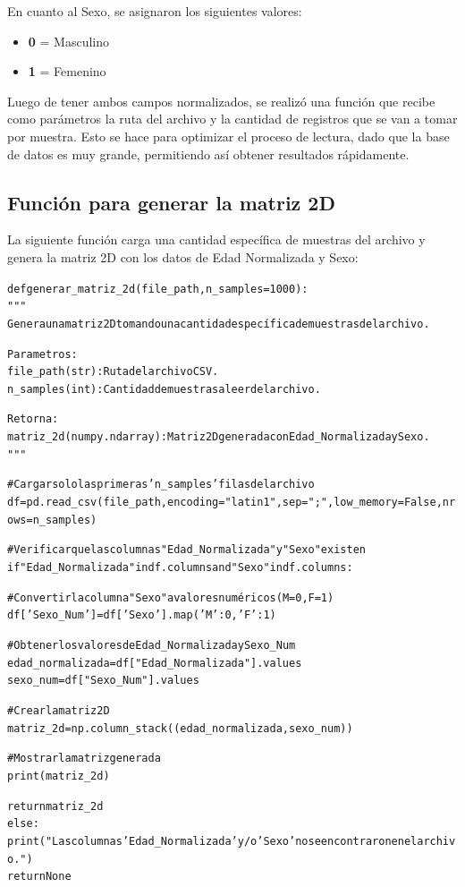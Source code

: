\documentclass[a4paper, 10pt]{article}
\begin{document}
En cuanto al Sexo, se asignaron los siguientes valores:

\begin{itemize}
    \item \textbf{0} = Masculino
    \item \textbf{1} = Femenino
\end{itemize}

Luego de tener ambos campos normalizados, se realizó una función que recibe como parámetros la ruta del archivo y la cantidad de registros que se van a tomar por muestra. Esto se hace para optimizar el proceso de lectura, dado que la base de datos es muy grande, permitiendo así obtener resultados rápidamente. 

\subsection{Función para generar la matriz 2D}\label{s:2.2}

La siguiente función carga una cantidad específica de muestras del archivo y genera la matriz 2D con los datos de Edad Normalizada y Sexo:

\begin{alltt}
def generar_matriz_2d(file_path, n_samples=1000):
    """
    Genera una matriz 2D tomando una cantidad específica de muestras del archivo.

    Parametros:
        file_path (str): Ruta del archivo CSV.
        n_samples (int): Cantidad de muestras a leer del archivo.

    Retorna:
        matriz_2d (numpy.ndarray): Matriz 2D generada con Edad_Normalizada y Sexo.
    """

    # Cargar solo las primeras 'n_samples' filas del archivo
    df = pd.read_csv(file_path, encoding="latin1", sep=";", low_memory=False, nrows=n_samples)

    # Verificar que las columnas "Edad_Normalizada" y "Sexo" existen
    if "Edad_Normalizada" in df.columns and "Sexo" in df.columns:

        # Convertir la columna "Sexo" a valores numéricos (M=0, F=1)
        df['Sexo_Num'] = df['Sexo'].map({'M': 0, 'F': 1})

        # Obtener los valores de Edad_Normalizada y Sexo_Num
        edad_normalizada = df["Edad_Normalizada"].values
        sexo_num = df["Sexo_Num"].values

        # Crear la matriz 2D
        matriz_2d = np.column_stack((edad_normalizada, sexo_num))

        # Mostrar la matriz generada
        print(matriz_2d)
        
        return matriz_2d
    else:
        print("Las columnas 'Edad_Normalizada' y/o 'Sexo' no se encontraron en el archivo.")
        return None 
\end{alltt}
\end{document}
